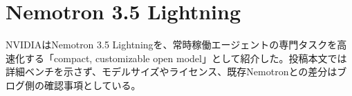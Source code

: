 \section{Nemotron 3.5 Lightning}
NVIDIAはNemotron 3.5 Lightningを、常時稼働エージェントの専門タスクを高速化する「compact, customizable open model」として紹介した。投稿本文では詳細ベンチを示さず、モデルサイズやライセンス、既存Nemotronとの差分はブログ側の確認事項としている。
